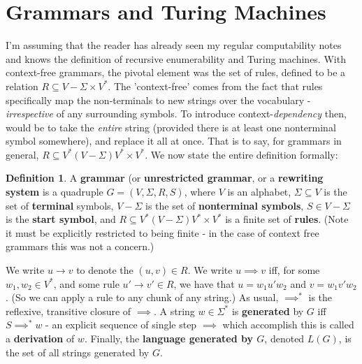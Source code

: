 \documentclass{article}
\theoremstyle{definition}
\newtheorem{definition}{Definition}[section]
\theoremstyle{plain}
\theoremstyle{theorem}
\begin{document}
\section{Grammars and Turing Machines}
I'm assuming that the reader has already seen my regular computability notes and knows the definition of recursive enumerability and Turing machines. With context-free grammars, the pivotal element was the set of rules, defined to be a relation $R \subseteq V-\Sigma \times V^*$. The 'context-free' comes from the fact that rules specifically map the non-terminals to new strings over the vocabulary - \textit{irrespective} of any surrounding symbols. To introduce context-\textit{dependency} then, would be to take the \textit{entire} string (provided there is at least one nonterminal symbol somewhere), and replace it all at once. That is to say, for grammars in general, $R \subseteq V^*(V-\Sigma)V^* \times V^*$. We now state the entire definition formally:
\begin{definition}
	A \textbf{grammar} (or \textbf{unrestricted grammar}, or a \textbf{rewriting system} is a quadruple $G = (V,\Sigma,R,S)$, where $V$ is an alphabet, $\Sigma \subseteq V$ is the set of \textbf{terminal} symbols, $V - \Sigma$ is the set of \textbf{nonterminal symbols}, $S \in V-\Sigma$ is the \textbf{start symbol}, and $R \subseteq V^*(V-\Sigma)V^* \times V^*$ is a finite set of \textbf{rules}. (Note it must be explicitly restricted to being finite - in the case of context free grammars this was not a concern.) \par 
	We write $u \to v$ to denote the $(u,v) \in R$. We write $u \implies v$ iff, for some $w_1,w_2 \in V^*$, and some rule $u' \to v' \in R$, we have that $u = w_1u'w_2$ and $v = w_1v'w_2$. (So we can apply a rule to any chunk of any string.) As usual, $\implies^*$ is the reflexive, transitive closure of $\implies$. A string $w \in \Sigma^*$ is \textbf{generated} by $G$ iff $S \implies^* w$ - an explicit sequence of single step $\implies$ which accomplish this is called a \textbf{derivation} of $w$. Finally, the \textbf{language generated by $G$}, denoted $L(G)$, is the set of all strings generated by $G$. 
\end{definition}
\end{document}

